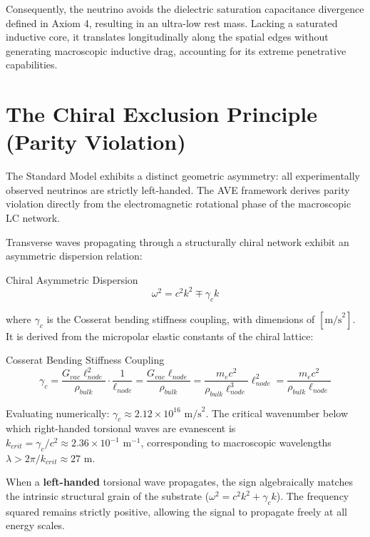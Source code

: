 Consequently, the neutrino avoids the dielectric saturation capacitance divergence defined in Axiom 4, resulting in an ultra-low rest mass. Lacking a saturated inductive core, it translates longitudinally along the spatial edges without generating macroscopic inductive drag, accounting for its extreme penetrative capabilities.

\section{The Chiral Exclusion Principle (Parity Violation)}
The Standard Model exhibits a distinct geometric asymmetry: all experimentally observed neutrinos are strictly left-handed. The AVE framework derives parity violation directly from the electromagnetic rotational phase of the macroscopic LC network.

Transverse waves propagating through a structurally chiral network exhibit an asymmetric dispersion relation:
\begin{resultbox}{Chiral Asymmetric Dispersion}
\begin{equation}
    \omega^2 = c^2 k^2 \mp \gamma_c k
\end{equation}
\end{resultbox}

where $\gamma_c$ is the Cosserat bending stiffness coupling, with dimensions of $[\text{m/s}^2]$. It is derived from the micropolar elastic constants of the chiral lattice:
\begin{resultbox}{Cosserat Bending Stiffness Coupling}
\begin{equation}
    \gamma_c = \frac{G_{vac} \ell_{node}^2}{\rho_{bulk}} \cdot \frac{1}{\ell_{node}} = \frac{G_{vac} \ell_{node}}{\rho_{bulk}} = \frac{m_e c^2}{\rho_{bulk} \ell_{node}^3} \ell_{node}^2 = \frac{m_e c^2}{\rho_{bulk} \ell_{node}}
\end{equation}
\end{resultbox}
Evaluating numerically: $\gamma_c \approx 2.12 \times 10^{16} \text{ m/s}^2$. The critical wavenumber below which right-handed torsional waves are evanescent is $k_{crit} = \gamma_c / c^2 \approx 2.36 \times 10^{-1} \text{ m}^{-1}$, corresponding to macroscopic wavelengths $\lambda > 2\pi/k_{crit} \approx 27 \text{ m}$.

When a \textbf{left-handed} torsional wave propagates, the sign algebraically matches the intrinsic structural grain of the substrate ($\omega^2 = c^2 k^2 + \gamma_c k$). The frequency squared remains strictly positive, allowing the signal to propagate freely at all energy scales.

